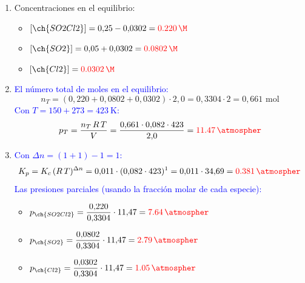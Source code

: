 \begin{exerciseEVAU}
\begin{solu}
    \begin{enumerate}[label=\letraminuscula]
        \item Concentraciones en el equilibrio:
        \begin{itemize}
            \item \([\ch{SO2Cl2}] = 0{,}25 - 0{,}0302 = \textcolor{red}{\qty{0{,}220}{\M}}\)
            \item \([\ch{SO2}] = 0{,}05 + 0{,}0302 = \textcolor{red}{\qty{0{,}0802}{\M}}\)
            \item \([\ch{Cl2}] = \textcolor{red}{\qty{0{,}0302}{\M}}\)
        \end{itemize}

        \item \textcolor{blue}{El número total de moles en el equilibrio:}
        \[
            n_T = (0{,}220 + 0{,}0802 + 0{,}0302)\cdot2{,}0 = 0{,}3304\cdot2 = 0{,}661 \text{ mol}
        \]
        \textcolor{blue}{Con \(T = 150 + 273 = \qty{423}{\K}\):}
        \[
            p_T = \frac{n_T\,R\,T}{V} = \frac{0{,}661\cdot0{,}082\cdot423}{2{,}0} = \textcolor{red}{\qty{11{,}47}{\atmospher}}
        \]

        \item \textcolor{blue}{Con \(\Delta n = (1+1)-1 = 1\):}
        \[
            K_p = K_c\,(R\,T)^{\Delta n} = 0{,}011\cdot(0{,}082\cdot423)^1 = 0{,}011\cdot34{,}69 = \textcolor{red}{\qty{0{,}381}{\atmospher}}
        \]
        \textcolor{blue}{Las presiones parciales (usando la fracción molar de cada especie):}
        \begin{itemize}
            \item \(p_{\ch{SO2Cl2}} = \dfrac{0{,}220}{0{,}3304}\cdot11{,}47 = \textcolor{red}{\qty{7{,}64}{\atmospher}}\)
            \item \(p_{\ch{SO2}} = \dfrac{0{,}0802}{0{,}3304}\cdot11{,}47 = \textcolor{red}{\qty{2{,}79}{\atmospher}}\)
            \item \(p_{\ch{Cl2}} = \dfrac{0{,}0302}{0{,}3304}\cdot11{,}47 = \textcolor{red}{\qty{1{,}05}{\atmospher}}\)
        \end{itemize}
    \end{enumerate}

    \end{solu}
\end{exerciseEVAU}


